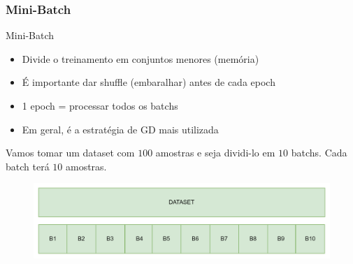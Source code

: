 \documentclass{beamer}
\begin{document}
\begin{frame}
	\frametitle{Mini-Batch}
	\begin{block}{Mini-Batch}
		\begin{itemize}
			\item Divide o treinamento em conjuntos menores (memória)
			\item É importante dar shuffle (embaralhar) antes de cada epoch
			\item 1 epoch = processar todos os batchs
			\item Em geral, é a estratégia de GD mais utilizada	
			
		\end{itemize}
		Vamos tomar um dataset com $100$ amostras e seja dividi-lo em $10$ batchs. Cada batch terá $10$ amostras.
		\begin{figure}
			\centering
			\includegraphics[width=1\linewidth]{figures/minibatch.png}
		\end{figure}
		
	\end{block}
\end{frame}
\end{document}
